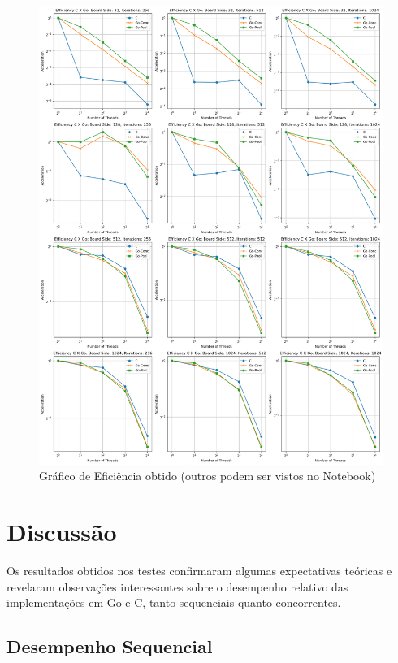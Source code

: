 \documentclass[14]{article}
\begin{document}
\begin{figure}[!h]
    \begin{center}
    \caption{Gráfico de Eficiência obtido (outros podem ser vistos no Notebook)}
    \includegraphics[width=\textwidth]{grafico_eficiencia.png}
    \end{center}
\end{figure}

\section{ Discussão }

Os resultados obtidos nos testes confirmaram algumas expectativas teóricas e revelaram observações interessantes sobre o desempenho relativo das implementações em Go e C, tanto sequenciais quanto concorrentes.

\subsection{Desempenho Sequencial}
\end{document}
